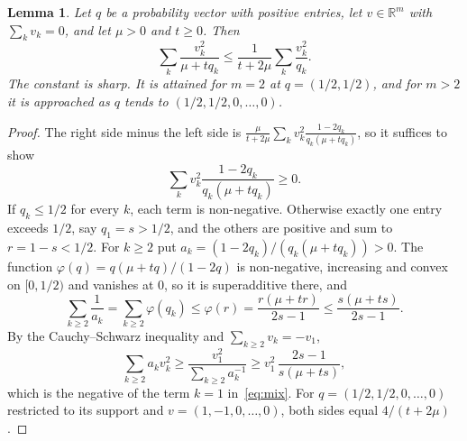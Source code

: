 \documentclass[11pt]{amsart}
\newtheorem{lemma}[theorem]{Lemma}
\theoremstyle{definition}
\theoremstyle{remark}
\newcommand{\R}{\mathbb{R}}
\begin{document}
\begin{lemma}\label{lem:mix}
Let $q$ be a probability vector with positive entries, let $v\in\R^m$ with $\sum_kv_k=0$, and let $\mu>0$ and
$t\ge0$. Then
\[
\sum_k\frac{v_k^2}{\mu+tq_k}\le\frac{1}{t+2\mu}\sum_k\frac{v_k^2}{q_k}.
\]
The constant is sharp. It is attained for $m=2$ at $q=(1/2,1/2)$, and for $m>2$ it is approached as $q$ tends to
$(1/2,1/2,0,\dots,0)$.
\end{lemma}

\begin{proof}
The right side minus the left side is $\frac{\mu}{t+2\mu}\sum_kv_k^2\frac{1-2q_k}{q_k(\mu+tq_k)}$, so it suffices to
show
\begin{equation}\label{eq:mix}
\sum_kv_k^2\frac{1-2q_k}{q_k(\mu+tq_k)}\ge0 .
\end{equation}
If $q_k\le1/2$ for every $k$, each term is non-negative. Otherwise exactly one entry exceeds $1/2$, say $q_1=s>1/2$, and
the others are positive and sum to $r=1-s<1/2$. For $k\ge2$ put $a_k=(1-2q_k)/(q_k(\mu+tq_k))>0$. The function
$\varphi(q)=q(\mu+tq)/(1-2q)$ is non-negative, increasing and convex on $[0,1/2)$ and vanishes at $0$, so it is
superadditive there, and
\[
\sum_{k\ge2}\frac1{a_k}=\sum_{k\ge2}\varphi(q_k)\le\varphi(r)=\frac{r(\mu+tr)}{2s-1}\le\frac{s(\mu+ts)}{2s-1}.
\]
By the Cauchy--Schwarz inequality and $\sum_{k\ge2}v_k=-v_1$,
\[
\sum_{k\ge2}a_kv_k^2\ge\frac{v_1^2}{\sum_{k\ge2}a_k^{-1}}\ge v_1^2\,\frac{2s-1}{s(\mu+ts)},
\]
which is the negative of the term $k=1$ in~\eqref{eq:mix}. For $q=(1/2,1/2,0,\dots,0)$ restricted to its support and
$v=(1,-1,0,\dots,0)$, both sides equal $4/(t+2\mu)$.
\end{proof}
\end{document}
